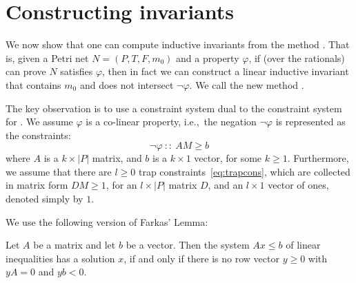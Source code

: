 \section{Constructing invariants}
\label{sec:constructing_invariants}

We now show that one can compute inductive invariants from the method
\safetyref.
That is, given a Petri net $N=(P,T,F,m_0)$ and a property $\varphi$, if
\safetyref{} (over the rationals) can prove $N$ satisfies $\varphi$, then in fact we can construct a linear inductive invariant
that contains $m_0$ and does not intersect $\lnot\varphi$. We call the
new method \invariantref.

The key observation is to use a constraint system dual to the constraint system for \safetyref.
%
We assume $\varphi$ is a co-linear property, i.e.,~the negation $\lnot\varphi$ is
represented as the constraints:
 $$\neg \varphi\  :: \ A M \ge b$$
where $A$ is a $k\times |P|$ matrix, and $b$ is a $k\times 1$ vector, for some
$k\geq 1$. Furthermore, we assume that there are $l\geq 0$ trap
constraints~\eqref{eq:trapcons}, which are collected in matrix form $D M \geq
1$, for an $l\times |P|$ matrix $D$, and an $l\times 1$ vector of ones, denoted
simply by $1$.

We use the following version of Farkas' Lemma:

\begin{lemma}
\label{lem:farkas}
Let $A$ be a matrix and let $b$ be a vector.
Then the system $Ax \le b$ of linear inequalities has a solution $x$,
if and only if there is no row vector $y \ge 0$ with $yA = 0$ and $yb < 0$.
\end{lemma}

